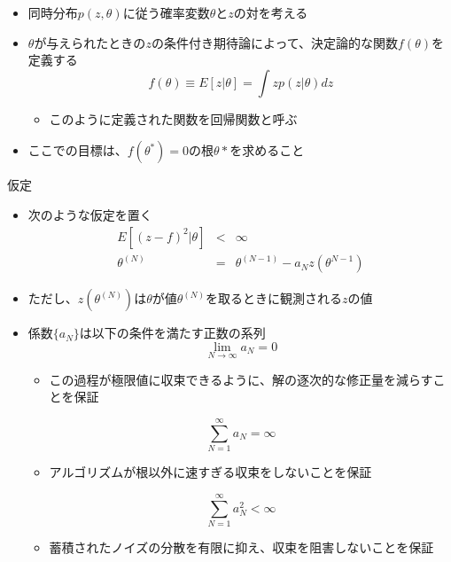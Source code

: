  \begin{frame}
	\begin{itemize}
	 \item 同時分布$p(z,\theta)$に従う確率変数$\theta$と$z$の対を考える
	 \item $\theta$が与えられたときの$z$の条件付き期待論によって、決定論的な関数$f(\theta)$を定義する
				 \begin{equation}
					f(\theta) \equiv E[z|\theta] = \int zp(z|\theta)dz
				 \end{equation}
				 \begin{itemize}
					\item このように定義された関数を回帰関数と呼ぶ
				 \end{itemize}
	 \item ここでの目標は、$f(\theta^\ast)=0$の根$\theta\ast$を求めること
	\end{itemize}
 \end{frame}

 \begin{frame}{仮定}
	\begin{itemize}
	 \item 次のような仮定を置く
				 \begin{eqnarray}
					E[(z-f)^2|\theta] &<& \infty\\
					\theta^{(N)}&=& \theta^{(N-1)}-a_Nz(\theta^{N-1})
				 \end{eqnarray}
	 \item ただし、$z(\theta^{(N)})$は$\theta$が値$\theta^{(N)}$を取るときに観測される$z$の値
	 \item 係数$\{a_N\}$は以下の条件を満たす正数の系列
				 \begin{equation}
					\lim_{N \rightarrow \infty}a_N=0
				 \end{equation}
				 \begin{itemize}
					\item この過程が極限値に収束できるように、解の逐次的な修正量を減らすことを保証
				 \end{itemize}
				 \begin{equation}
					\sum_{N=1}^{\infty}a_N=\infty
				 \end{equation}
				 \begin{itemize}
					\item アルゴリズムが根以外に速すぎる収束をしないことを保証
				 \end{itemize}
				 \begin{equation}
					\sum_{N=1}^{\infty}a_N^2 < \infty
				 \end{equation}
				 \begin{itemize}
					\item 蓄積されたノイズの分散を有限に抑え、収束を阻害しないことを保証
				 \end{itemize}
	\end{itemize}
 \end{frame}

